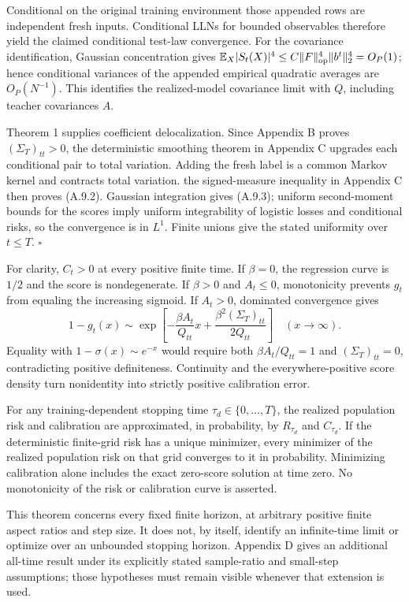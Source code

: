 \documentclass[
  11pt,
  a4paper,
]{article}
\begin{document}
Conditional on the original training environment those appended rows are
independent fresh inputs. Conditional LLNs for bounded observables
therefore yield the claimed conditional test-law convergence. For the
covariance identification, Gaussian concentration gives
\(\mathbb E_X|S_t(X)|^4\le C\|F\|_{\rm op}^4\|b^t\|_2^4=O_P(1)\); hence
conditional variances of the appended empirical quadratic averages are
\(O_P(N^{-1})\). This identifies the realized-model covariance limit
with \(Q\), including teacher covariances \(A\).

Theorem 1 supplies coefficient delocalization. Since Appendix B proves
\((\Sigma_T)_{tt}>0\), the deterministic smoothing theorem in Appendix C
upgrades each conditional pair to total variation. Adding the fresh
label is a common Markov kernel and contracts total variation. the
signed-measure inequality in Appendix C then proves (A.9.2). Gaussian
integration gives (A.9.3); uniform second-moment bounds for the scores
imply uniform integrability of logistic losses and conditional risks, so
the convergence is in \(L^1\). Finite unions give the stated uniformity
over \(t\le T\). \(\square\)

For clarity, \(C_t>0\) at every positive finite time. If \(\beta=0\),
the regression curve is \(1/2\) and the score is nondegenerate. If
\(\beta>0\) and \(A_t\le0\), monotonicity prevents \(g_t\) from equaling
the increasing sigmoid. If \(A_t>0\), dominated convergence gives \[
1-g_t(x)\sim
\exp\!\left[-\frac{\beta A_t}{Q_{tt}}x+
\frac{\beta^2(\Sigma_T)_{tt}}{2Q_{tt}}\right]
\quad(x\to\infty).
\] Equality with \(1-\sigma(x)\sim e^{-x}\) would require both
\(\beta A_t/Q_{tt}=1\) and \((\Sigma_T)_{tt}=0\), contradicting positive
definiteness. Continuity and the everywhere-positive score density turn
nonidentity into strictly positive calibration error.

For any training-dependent stopping time \(\tau_d\in\{0,\ldots,T\}\),
the realized population risk and calibration are approximated, in
probability, by \(R_{\tau_d}\) and \(C_{\tau_d}\). If the deterministic
finite-grid risk has a unique minimizer, every minimizer of the realized
population risk on that grid converges to it in probability. Minimizing
calibration alone includes the exact zero-score solution at time zero.
No monotonicity of the risk or calibration curve is asserted.

This theorem concerns every fixed finite horizon, at arbitrary positive
finite aspect ratios and step size. It does not, by itself, identify an
infinite-time limit or optimize over an unbounded stopping horizon.
Appendix D gives an additional all-time result under its explicitly
stated sample-ratio and small-step assumptions; those hypotheses must
remain visible whenever that extension is used.
\end{document}
